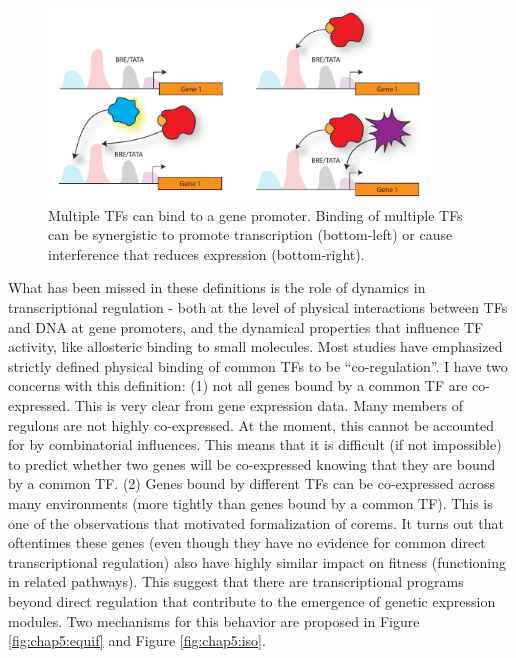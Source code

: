 \begin{figure}[h!]
    \centering
    \includegraphics[width=0.9\textwidth]{figures/combinatorial_reg}
 	\caption[Combinatorial regulation at gene promoters shapes gene expression]{Multiple TFs can bind to a gene promoter. Binding of multiple TFs can be synergistic to promote transcription (bottom-left) or cause interference that reduces expression (bottom-right). 
 	}
\label{fig:chap5:combinatorial_reg}
\end{figure}

What has been missed in these definitions is the role of dynamics in transcriptional regulation - both at the level of physical interactions between TFs and DNA at gene promoters, and the dynamical properties that influence TF activity, like allosteric binding to small molecules. Most studies have emphasized strictly defined physical binding of common TFs to be ``co-regulation''. I have two concerns with this definition: (1) not all genes bound by a common TF are co-expressed. This is very clear from gene expression data. Many members of regulons are not highly co-expressed. At the moment, this cannot be accounted for by combinatorial influences. This means that it is difficult (if not impossible) to predict whether two genes will be co-expressed knowing that they are bound by a common TF. (2) Genes bound by different TFs can be co-expressed across many environments (more tightly than genes bound by a common TF). This is one of the observations that motivated formalization of corems. It turns out that oftentimes these genes (even though they have no evidence for common direct transcriptional regulation) also have highly similar impact on fitness (functioning in related pathways). This suggest that there are transcriptional programs beyond direct regulation that contribute to the emergence of genetic expression modules. Two mechanisms for this behavior are proposed in Figure \ref{fig:chap5:equif} and Figure \ref{fig:chap5:iso}.


